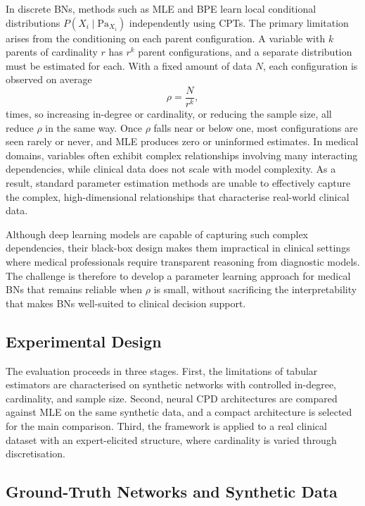 \documentclass[a4paper,fleqn]{cas-dc}
\newcommand{\Pa}{\mathrm{Pa}}
\begin{document}
In discrete BNs, methods such as MLE and BPE learn local conditional distributions $P(X_i\mid\Pa_{X_i})$ independently using CPTs. The primary limitation arises from the conditioning on each parent configuration. A variable with $k$ parents of cardinality $r$ has $r^k$ parent configurations, and a separate distribution must be estimated for each. With a fixed amount of data $N$, each configuration is observed on average
\begin{equation}
\rho = \frac{N}{r^{k}},
\label{eq:rho}
\end{equation}
times, so increasing in-degree or cardinality, or reducing the sample size, all reduce $\rho$ in the same way. Once $\rho$ falls near or below one, most configurations are seen rarely or never, and MLE produces zero or uninformed estimates. In medical domains, variables often exhibit complex relationships involving many interacting dependencies, while clinical data does not scale with model complexity. As a result, standard parameter estimation methods are unable to effectively capture the complex, high-dimensional relationships that characterise real-world clinical data.

Although deep learning models are capable of capturing such complex dependencies, their black-box design makes them impractical in clinical settings where medical professionals require transparent reasoning from diagnostic models. The challenge is therefore to develop a parameter learning approach for medical BNs that remains reliable when $\rho$ is small, without sacrificing the interpretability that makes BNs well-suited to clinical decision support.

\subsection{Experimental Design}

The evaluation proceeds in three stages. First, the limitations of tabular estimators are characterised on synthetic networks with controlled in-degree, cardinality, and sample size. Second, neural CPD architectures are compared against MLE on the same synthetic data, and a compact architecture is selected for the main comparison. Third, the framework is applied to a real clinical dataset with an expert-elicited structure, where cardinality is varied through discretisation.

\subsection{Ground-Truth Networks and Synthetic Data}
\end{document}
